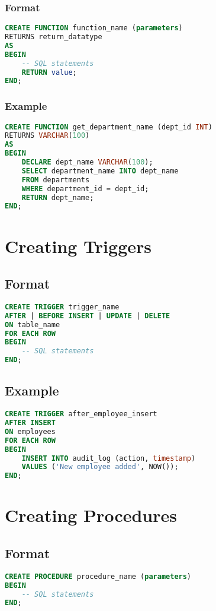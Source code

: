\documentclass{article}
\begin{document}
\subsubsection{Format}
\begin{lstlisting}[language=SQL]
CREATE FUNCTION function_name (parameters)
RETURNS return_datatype
AS
BEGIN
    -- SQL statements
    RETURN value;
END;
\end{lstlisting}

\subsubsection{Example}
\begin{lstlisting}[language=SQL]
CREATE FUNCTION get_department_name (dept_id INT)
RETURNS VARCHAR(100)
AS
BEGIN
    DECLARE dept_name VARCHAR(100);
    SELECT department_name INTO dept_name
    FROM departments
    WHERE department_id = dept_id;
    RETURN dept_name;
END;
\end{lstlisting}

\newpage
\section{Creating Triggers}

\subsection{Format}
\begin{lstlisting}[language=SQL]
CREATE TRIGGER trigger_name
AFTER | BEFORE INSERT | UPDATE | DELETE
ON table_name
FOR EACH ROW
BEGIN
    -- SQL statements
END;
\end{lstlisting}

\subsection{Example}
\begin{lstlisting}[language=SQL]
CREATE TRIGGER after_employee_insert
AFTER INSERT
ON employees
FOR EACH ROW
BEGIN
    INSERT INTO audit_log (action, timestamp)
    VALUES ('New employee added', NOW());
END;
\end{lstlisting}

\newpage
\section{Creating Procedures}

\subsection{Format}
\begin{lstlisting}[language=SQL]
CREATE PROCEDURE procedure_name (parameters)
BEGIN
    -- SQL statements
END;
\end{lstlisting}
\end{document}
